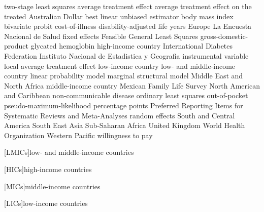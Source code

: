 \begin{acronym}
 {two-stage least squares}
 {average treatment effect}
 {average treatment effect on the treated}
 {Australian Dollar}
 {best linear unbiased estimator}
 {body mass index}  
 {bivariate probit}
 {cost-of-illness} 
 {disability-adjusted life years}
 {Europe}
 {La Encuesta Nacional de Salud}
 {fixed effects}  
 {Feasible General Least Squares}
 {gross-domestic-product} 
 {glycated hemoglobin}  
 {high-income country} 
 {International Diabetes Federation}
 {Instituto Nacional de Estadistica y Geografia} 
 {instrumental variable}
 {local average treatment effect}
 {low-income country} 
 {low- and middle-income country} 
 {linear probability model}
 {marginal structural model} 
 {Middle East and North Africa}
 {middle-income country}  
 {Mexican Family Life Survey}
 {North American and Caribbean}
 {non-communicable disease}
 {ordinary least squares}
 {out-of-pocket}   
 {pseudo-maximum-likelihood}
 {percentage points}
 {Preferred Reporting Items for Systematic Reviews and Meta-Analyses}
 {random effects}
 {South and Central America}
 {South East Asia}
 {Sub-Saharan Africa}
 {United Kingdom}
 {World Health Organization}
 {Western Pacific}
 {willingness to pay
}    

\end{acronym}

[LMICs]{low- and middle-income countries}  

[HICs]{high-income countries}

[MICs]{middle-income countries}
 
[LICs]{low-income countries} 